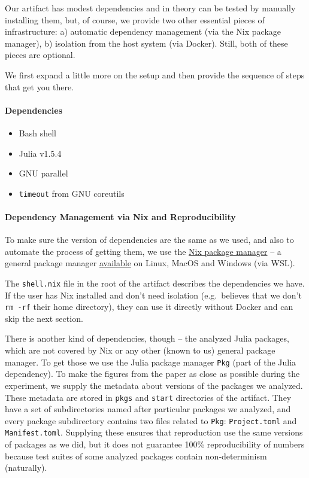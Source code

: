\documentclass[
]{article}
\begin{document}
Our artifact has modest dependencies and in theory can be tested by
manually installing them, but, of course, we provide two other essential
pieces of infrastructure: a) automatic dependency management (via the
Nix package manager), b) isolation from the host system (via Docker).
Still, both of these pieces are optional.

We first expand a little more on the setup and then provide the sequence
of steps that get you there.

\hypertarget{dependencies}{%
\paragraph{Dependencies}\label{dependencies}}

\begin{itemize}
\item
  Bash shell
\item
  Julia v1.5.4
\item
  GNU parallel
\item
  \texttt{timeout} from GNU coreutils
\end{itemize}

\hypertarget{dependency-management-via-nix-and-reproducibility}{%
\paragraph{Dependency Management via Nix and
Reproducibility}\label{dependency-management-via-nix-and-reproducibility}}

To make sure the version of dependencies are the same as we used, and
also to automate the process of getting them, we use the
\href{https://nixos.org/manual/nix/stable/\#chap-introduction}{Nix
package manager} -- a general package manager
\href{https://nixos.org/guides/install-nix.html}{available} on Linux,
MacOS and Windows (via WSL).

The \texttt{shell.nix} file in the root of the artifact describes the
dependencies we have. If the user has Nix installed and don't need
isolation (e.g.~believes that we don't \texttt{rm\ -rf} their home
directory), they can use it directly without Docker and can skip the
next section.

There is another kind of dependencies, though -- the analyzed Julia
packages, which are not covered by Nix or any other (known to us)
general package manager. To get those we use the Julia package manager
\texttt{Pkg} (part of the Julia dependency). To make the figures from
the paper as close as possible during the experiment, we supply the
metadata about versions of the packages we analyzed. These metadata are
stored in \texttt{pkgs} and \texttt{start} directories of the artifact.
They have a set of subdirectories named after particular packages we
analyzed, and every package subdirectory contains two files related to
\texttt{Pkg}: \texttt{Project.toml} and \texttt{Manifest.toml}.
Supplying these ensures that reproduction use the same versions of
packages as we did, but it does not guarantee 100\% reproducibility of
numbers because test suites of some analyzed packages contain
non-determinism (naturally).
\end{document}
